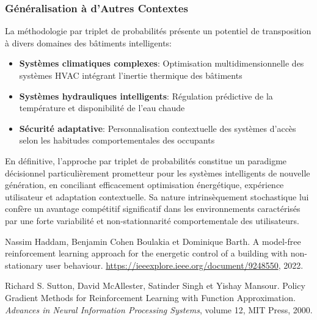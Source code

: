 \documentclass[a4paper,11pt]{article}
\begin{document}
\subsubsection{Généralisation à d'Autres Contextes}

La méthodologie par triplet de probabilités présente un potentiel de transposition à divers domaines des bâtiments intelligents:

\begin{itemize}
    \item \textbf{Systèmes climatiques complexes}: Optimisation multidimensionnelle des systèmes HVAC intégrant l'inertie thermique des bâtiments
    \item \textbf{Systèmes hydrauliques intelligents}: Régulation prédictive de la température et disponibilité de l'eau chaude
    \item \textbf{Sécurité adaptative}: Personnalisation contextuelle des systèmes d'accès selon les habitudes comportementales des occupants
\end{itemize}

En définitive, l'approche par triplet de probabilités constitue un paradigme décisionnel particulièrement prometteur pour les systèmes intelligents de nouvelle génération, en conciliant efficacement optimisation énergétique, expérience utilisateur et adaptation contextuelle. Sa nature intrinsèquement stochastique lui confère un avantage compétitif significatif dans les environnements caractérisés par une forte variabilité et non-stationnarité comportementale des utilisateurs.

\appendix

% 
% 
\clearpage
\newpage
\begin{thebibliography}{9}
 Nassim Haddam, Benjamin Cohen Boulakia et Dominique Barth. 
A model-free reinforcement learning approach for the energetic control of a building with non-stationary user behaviour.
\url{https://ieeexplore.ieee.org/document/9248550}, 2022.

 Richard S. Sutton, David McAllester, Satinder Singh et Yishay Mansour.
Policy Gradient Methods for Reinforcement Learning with Function Approximation.
\emph{Advances in Neural Information Processing Systems}, volume 12, MIT Press, 2000.
\end{thebibliography}
\end{document}
